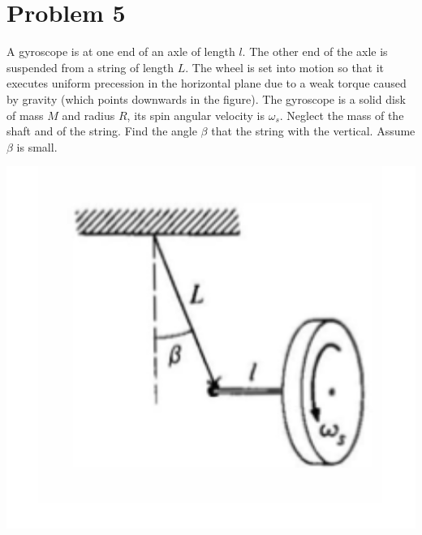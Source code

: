 \documentclass[10pt]{article}
\begin{document}
	\pagebreak
	\section*{Problem 5}
	A gyroscope is at one end of an axle of length $l$. The other end of the axle is suspended from a string 
	of length $L$. The wheel is set into motion so that it executes uniform precession in the horizontal plane
	due to a weak torque caused by gravity (which points downwards in the figure). The gyroscope is a solid disk
	of mass $M$ and radius $R$, its spin angular velocity is $\omega_s$. Neglect the mass of the shaft and of the
	string. Find the angle $\beta$ that the string with the vertical. Assume $\beta$ is small. 

	\begin{center}
		\includegraphics[scale=0.8]{q5.png}
	\end{center}
\end{document}
